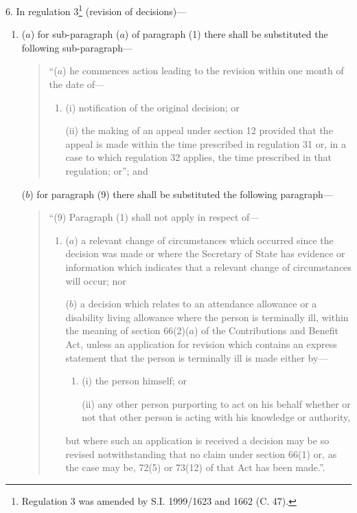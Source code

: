 \documentclass[12pt,a4paper]{article}
\begin{document}
6.  In regulation 3\footnote{\frenchspacing Regulation 3 was amended by S.I. 1999/1623 and 1662 (C. 47).} (revision of decisions)—
\begin{enumerate}\item[]
($a$) for sub-paragraph ($a$) of paragraph (1) there shall be substituted the following sub-paragraph—
\begin{quotation}
“($a$) he commences action leading to the revision within one month of the date of—
\begin{enumerate}\item[]
(i) notification of the original decision; or

(ii) the making of an appeal under section 12 provided that the appeal is made within the time prescribed in regulation 31 or, in a case to which regulation 32 applies, the time prescribed in that regulation; or”; and
\end{enumerate}
\end{quotation}

($b$) for paragraph (9) there shall be substituted the following paragraph—
\begin{quotation}
“(9) Paragraph (1) shall not apply in respect of—
\begin{enumerate}\item[]
($a$) a relevant change of circumstances which occurred since the decision was made or where the Secretary of State has evidence or information which indicates that a relevant change of circumstances will occur; nor

($b$) a decision which relates to an attendance allowance or a disability living allowance where the person is terminally ill, within the meaning of section 66(2)($a$) of the Contributions and Benefit Act, unless an application for revision which contains an express statement that the person is terminally ill is made either by—
\begin{enumerate}\item[]
(i) the person himself; or

(ii) any other person purporting to act on his behalf whether or not that other person is acting with his knowledge or authority,
\end{enumerate}
but where such an application is received a decision may be so revised notwithstanding that no claim under section 66(1) or, as the case may be, 72(5) or 73(12) of that Act has been made.”.
\end{enumerate}
\end{quotation}
\end{enumerate}
\end{document}
